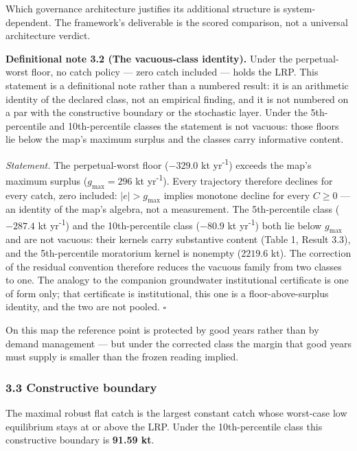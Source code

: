 Which governance architecture justifies its additional structure is
system-dependent. The framework's deliverable is the scored comparison,
not a universal architecture verdict.

\textbf{Definitional note 3.2 (The vacuous-class identity).} Under the
perpetual-worst floor, no catch policy --- zero catch included --- holds
the LRP. This statement is a definitional note rather than a numbered
result: it is an arithmetic identity of the declared class, not an
empirical finding, and it is not numbered on a par with the constructive
boundary or the stochastic layer. Under the 5th-percentile and
10th-percentile classes the statement is not vacuous: those floors lie
below the map's maximum surplus and the classes carry informative
content.

\emph{Statement.} The perpetual-worst floor (\(-329.0\) kt yr\textsuperscript{-1}) exceeds
the map's maximum surplus (\(g_{\max} = 296\) kt yr\textsuperscript{-1}). Every trajectory
therefore declines for every catch, zero included: \(|e| > g_{\max}\)
implies monotone decline for every \(C \ge 0\) --- an identity of the
map's algebra, not a measurement. The 5th-percentile class (\(-287.4\)
kt yr\textsuperscript{-1}) and the 10th-percentile class (\(-80.9\) kt yr\textsuperscript{-1}) both lie
below \(g_{\max}\) and are not vacuous: their kernels carry substantive
content (Table 1, Result 3.3), and the 5th-percentile moratorium kernel
is nonempty (\(2219.6\) kt). The correction of the residual convention
therefore reduces the vacuous family from two classes to one. The
analogy to the companion groundwater institutional certificate is one of
form only; that certificate is institutional, this one is a
floor-above-surplus identity, and the two are not pooled. \ensuremath{\square}

On this map the reference point is protected by good years rather than
by demand management --- but under the corrected class the margin that
good years must supply is smaller than the frozen reading implied.

\subsubsection{3.3 Constructive boundary}\label{budget-constructive-boundary}

The maximal robust flat catch is the largest constant catch whose
worst-case low equilibrium stays at or above the LRP. Under the
10th-percentile class this constructive boundary is \textbf{91.59 kt}.

